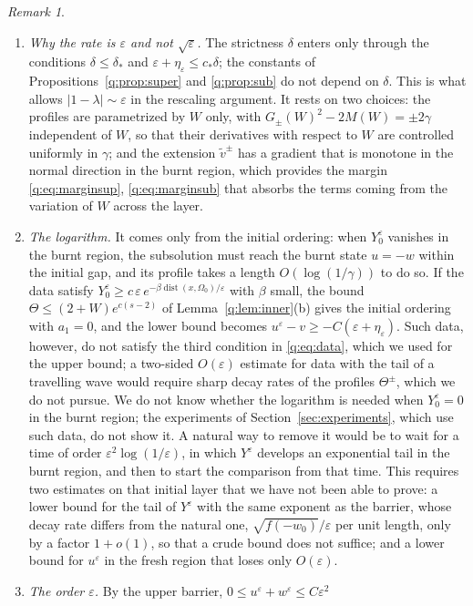 \documentclass[11pt]{amsart}
\theoremstyle{definition}
\theoremstyle{remark}
\newtheorem{remark}[theorem]{Remark}
\newcommand{\ve}{\varepsilon}
\begin{document}
\begin{remark}\label{q:rem:rate}
\begin{enumerate}
\item \emph{Why the rate is $\ve$ and not $\sqrt\ve$.} The strictness $\delta$ enters only
through the conditions $\delta\le\delta_*$ and $\ve+\eta_\ve\le c_*\delta$; the constants of
Propositions~\ref{q:prop:super} and \ref{q:prop:sub} do not depend on $\delta$. This is what
allows $|1-\lambda|\sim\ve$ in the rescaling argument. It rests on two choices: the
profiles are parametrized by $W$ only, with $G_\pm(W)^2-2M(W)=\pm2\gamma$ independent of
$W$, so that their derivatives with respect to $W$ are controlled uniformly in $\gamma$;
and the extension $\tilde v^\pm$ has a gradient that is monotone in the normal direction
in the burnt region, which provides the margin \eqref{q:eq:marginsup},
\eqref{q:eq:marginsub} that absorbs the terms coming from the variation of $W$ across
the layer.
\item \emph{The logarithm.} It comes only from the initial ordering: when
$Y_0^\ve$ vanishes in the burnt region, the subsolution must reach the burnt state
$u=-w$ within the initial gap, and its profile takes a length $O(\log(1/\gamma))$ to do
so. If the data satisfy $Y_0^\ve\ge c\,\ve\, e^{-\beta\operatorname{dist}(x,\Omega_0)/\ve}$ with
$\beta$ small, the bound $\Theta\le(2+W)e^{c(s-2)}$ of Lemma~\ref{q:lem:inner}(b) gives the
initial ordering with $a_1=0$, and the lower bound becomes $u^\ve-v\ge-C(\ve+\eta_\ve)$.
Such data, however, do not satisfy the third condition in \eqref{q:eq:data}, which we
used for the upper bound; a two-sided $O(\ve)$ estimate for data with the tail of a
travelling wave would require sharp decay rates of the profiles $\Theta^\pm$, which we do
not pursue. We do not know whether the logarithm is needed when $Y_0^\ve=0$ in the burnt
region; the experiments of Section~\ref{sec:experiments}, which use such data, do not show
it. A natural way to remove it would be to wait for a time of order $\ve^2\log(1/\ve)$, in
which $Y^\ve$ develops an exponential tail in the burnt region, and then to start the
comparison from that time. This requires two estimates on that initial layer that we
have not been able to prove: a lower bound for the tail of $Y^\ve$ with the same exponent as
the barrier, whose decay rate differs from the natural one, $\sqrt{f(-w_0)}/\ve$
per unit length, only by a factor $1+o(1)$, so that a crude bound does not suffice; and a
lower bound for $u^\ve$ in the fresh
region that loses only $O(\ve)$.
\item \emph{The order $\ve$.} By the upper barrier, $0\le u^\ve+w^\ve\le C\ve^2$

\end{enumerate}
\end{remark}
\end{document}
